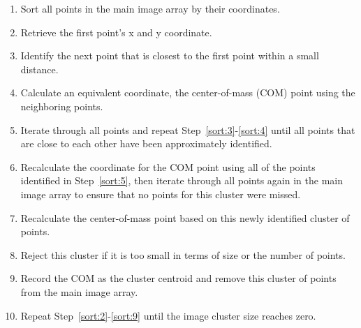 \begin{enumerate}
\item \label{sort:1} Sort all points in the main image array by their coordinates.
\item \label{sort:2} Retrieve the first point's x and y coordinate.
\item \label{sort:3} Identify the next point that is closest to the first point within a small distance.
\item \label{sort:4} Calculate an equivalent coordinate, the center-of-mass (COM) point using the neighboring points.
\item \label{sort:5} Iterate through all points and repeat Step~\ref{sort:3}-\ref{sort:4} until all points that are close to each other have been approximately identified.
\item \label{sort:6} Recalculate the coordinate for the COM point using all of the points identified in Step~\ref{sort:5}, then iterate through all points again in the main image array to ensure that no points for this cluster were missed.
\item \label{sort:7} Recalculate the center-of-mass point based on this newly identified cluster of points.
\item \label{sort:8} Reject this cluster if it is too small in terms of size or the number of points.
\item \label{sort:9} Record the COM as the cluster centroid and remove this cluster of points from the main image array.
\item \label{sort:10} Repeat Step~\ref{sort:2}-\ref{sort:9} until the image cluster size reaches zero.
\end{enumerate}

